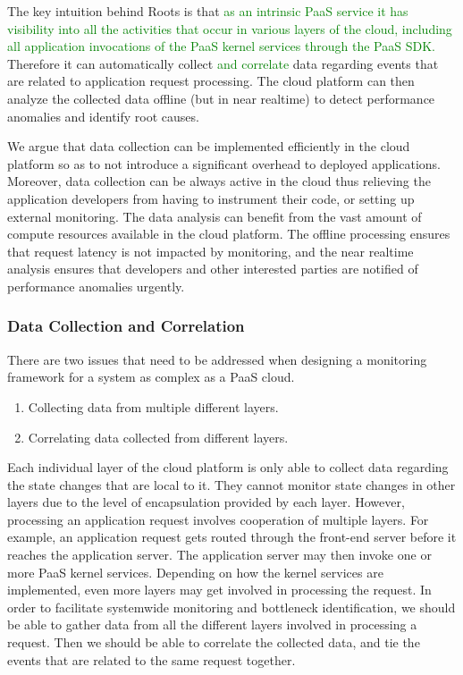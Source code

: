 The key intuition behind Roots is that \textcolor{green}{as an intrinsic PaaS service
it has visibility into all the activities that occur in various layers of the cloud,
including all application invocations of the PaaS kernel services through the
PaaS SDK.} Therefore
it can automatically collect \textcolor{green}{and correlate}
 data regarding events that are related to application request processing. 
The cloud platform can then analyze the collected data offline (but in near realtime) to detect 
performance anomalies and identify root causes.

We argue that data collection can be implemented efficiently in the cloud platform so as to not
introduce a significant overhead to deployed applications.
Moreover, data collection can be always active in the cloud thus relieving the application developers
from having to instrument their code, or setting up external monitoring.
The data analysis can benefit from the vast amount of compute
resources available in the cloud platform. The offline processing ensures that request
latency is not impacted by monitoring, and the near realtime analysis ensures that developers
and other interested parties are notified of performance anomalies urgently. 

\subsubsection{Data Collection and Correlation}

There are two issues that need to be addressed when designing a monitoring framework for
a system as complex as a PaaS cloud.
\begin{enumerate}
\item Collecting data from multiple different layers.
\item Correlating data collected from different layers.
\end{enumerate}

Each individual layer of the cloud platform is only able to collect data regarding the
state changes that are local to it. They cannot monitor state changes
in other layers due to the level of encapsulation provided by each layer. However,
processing an application request involves cooperation of multiple 
layers. For example, an application request gets routed through the front-end server before
it reaches the application server. The application server may then invoke one or more PaaS kernel
services. Depending on how the kernel services are implemented,
even more layers may get involved in processing the request. 
In order to facilitate systemwide monitoring and
bottleneck identification, we should be able to gather data from all the different layers involved
in processing a request. Then we should be able to correlate the collected data, and tie the events that
are related to the same request together.

